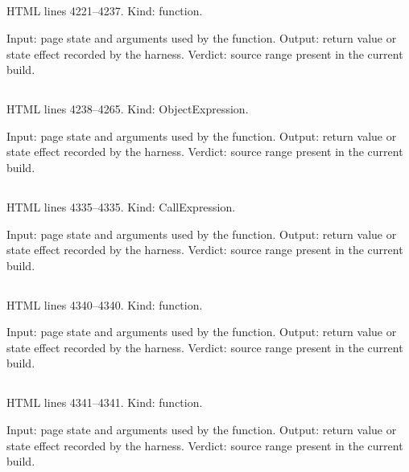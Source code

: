 \subsection*{\texttt{}}
\label{vf_155_sopBase}
HTML lines 4221--4237. Kind: function.

Input: page state and arguments used by the function.
Output: return value or state effect recorded by the harness.
Verdict: source range present in the current build.

\subsection*{\texttt{}}
\label{vf_156_SOP_PRESETS}
HTML lines 4238--4265. Kind: ObjectExpression.

Input: page state and arguments used by the function.
Output: return value or state effect recorded by the harness.
Verdict: source range present in the current build.

\subsection*{\texttt{}}
\label{vf_157_STORED_SOP}
HTML lines 4335--4335. Kind: CallExpression.

Input: page state and arguments used by the function.
Output: return value or state effect recorded by the harness.
Verdict: source range present in the current build.

\subsection*{\texttt{}}
\label{vf_158_sopLoadStored}
HTML lines 4340--4340. Kind: function.

Input: page state and arguments used by the function.
Output: return value or state effect recorded by the harness.
Verdict: source range present in the current build.

\subsection*{\texttt{}}
\label{vf_159_sopStore}
HTML lines 4341--4341. Kind: function.

Input: page state and arguments used by the function.
Output: return value or state effect recorded by the harness.
Verdict: source range present in the current build.

